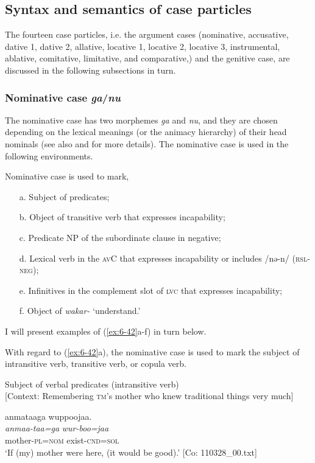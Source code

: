 \subsection{Syntax and semantics of case particles}

The fourteen case particles, i.e. the argument cases (nominative, accusative, dative 1, dative 2, allative, locative 1, locative 2, locative 3, instrumental, ablative, comitative, limitative, and comparative,) and the genitive case, are discussed in the following subsections in turn.

\subsubsection{Nominative case \textit{ga}/\textit{nu}}
\label{bkm:Ref366360662}
The nominative case has two morphemes \textit{ga} and \textit{nu}, and they are chosen depending on the lexical meanings (or the animacy hierarchy) of their head nominals (see also  and  for more details). The nominative case is used in the following environments.

\ea\label{ex:6-42}
 Nominative case is used to mark,\\

 \begin{itemize}
\item[a.]   Subject of predicates;
\item[b.] Object of transitive verb that expresses incapability;
\item[c.] Predicate NP of the subordinate clause in negative;
\item[d.] Lexical verb in the \textsc{av}C that expresses incapability or includes /nə-n/ (\textsc{rsl}-\textsc{neg});
\item[e.] Infinitives in the complement slot of \textsc{lvc} that expresses incapability;
\item[f.] Object of \textit{wakar-} ‘understand.’
\end{itemize}
I will present examples of (\ref{ex:6-42}a-f) in turn below.

With regard to (\ref{ex:6-42}a), the nominative case is used to mark the subject of intransitive verb, transitive verb, or copula verb.

\ea\label{ex:6-43}
\ea Subject of verbal predicates (intransitive verb)\\{}
[Context: Remembering \textsc{tm}’s mother who knew traditional things very much]

{\TM}
\glll anmataaga  wuppoojaa.\\
      \textit{anmaa-taa=ga}  \textit{wur-boo=jaa}\\
      mother-\textsc{pl}=\textsc{nom}  exist-\textsc{cnd}=\textsc{sol}\\
\glt ‘If (my) mother were here, (it would be good).’ [Co: 110328\_00.txt]

